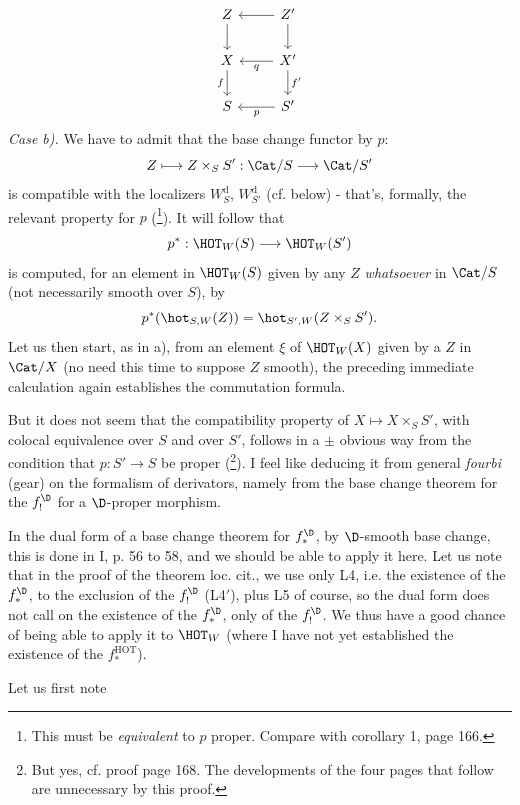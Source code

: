 \noindent{}%
\[
\begin{tikzcd}
Z \arrow[d] & Z' \arrow[l] \arrow[d] \\
X \arrow[d, "f"'] & X' \arrow[l, "q"] \arrow[d, "f'"] \\
S & S' \arrow[l, "p"]
\end{tikzcd}
\]
\textit{Case b).} We have to admit that the base change functor by $p$:
\[
Z \longmapsto Z \times_S S' : \Cat/S \longrightarrow \Cat/S'
\]
is compatible with the localizers $W^{\mathrm{d}}_{S}$, $W^{\mathrm{d}}_{S'}$ (cf. below) - that's, formally, the relevant property for $p$ (\footnote[79]{This must be \textit{equivalent} to $p$ proper. Compare with corollary 1, page 166.}). It will follow that %
\[
p^* : \HOT_W(S) \longrightarrow \HOT_W(S')
\]
is computed, for an element in $\HOT_W(S)$ given by any $Z$ \textit{whatsoever} in $\Cat/S$ (not necessarily smooth over $S$), by
\[
p^*(\hot_{S,W}(Z)) = \hot_{S',W}(Z \times_S S').
\]
Let us then start, as in a), from an element $\xi$ of $\HOT_W(X)$ given by a $Z$ in $\Cat/X$ (no need this time to suppose $Z$ smooth), the preceding immediate calculation again establishes the commutation formula.

But it does not seem that the compatibility property of $X \longmapsto X \times_S S'$, with colocal equivalence over $S$ and over $S'$, follows in a $\pm$ obvious way from the condition that $p : S' \longrightarrow S$ be proper (\footnote[80]{But yes, cf. proof page 168. The developments of the four pages that follow are unnecessary by this proof.}). I feel like deducing it from general \textit{fourbi} (gear) on the formalism of derivators, namely from the base change theorem for the $f_!^{\D}$ for a $\D$-proper morphism.

In the dual form of a base change theorem for $f_*^{\D}$, by $\D$-smooth base change, this is done in I, p. 56 to 58, and we should be able to apply it here. Let us note that in the proof of the theorem loc. cit., we use only L4, i.e. the existence of the $f_*^{\D}$, to the exclusion of the $f_!^{\D}$ (L4$'$), plus L5 of course, so the dual form does not call on the existence of the $f_*^{\D}$, only of the $f_!^{\D}$. We thus have a good chance of being able to apply it to $\HOT_W$ (where I have not yet established the existence of the $f_*^{\mathrm{HOT}}$). %

\noindent{}%
Let us first note

